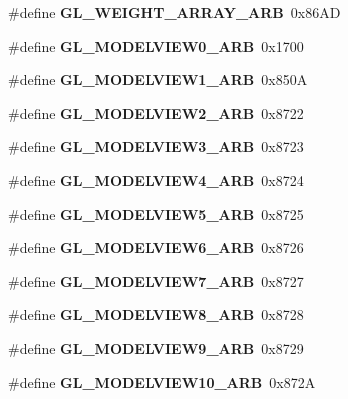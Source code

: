 \begin{DoxyCompactItemize}
\item 
\#define {\bfseries G\+L\+\_\+\+W\+E\+I\+G\+H\+T\+\_\+\+A\+R\+R\+A\+Y\+\_\+\+A\+R\+B}~0x86\+A\+D\label{_s_d_l__opengl_8h_a3689b10d11e254159d28b9b516f461f4}

\item 
\#define {\bfseries G\+L\+\_\+\+M\+O\+D\+E\+L\+V\+I\+E\+W0\+\_\+\+A\+R\+B}~0x1700\label{_s_d_l__opengl_8h_aeb39b3752a59fa1f51df89b024110926}

\item 
\#define {\bfseries G\+L\+\_\+\+M\+O\+D\+E\+L\+V\+I\+E\+W1\+\_\+\+A\+R\+B}~0x850\+A\label{_s_d_l__opengl_8h_a6ee7f305f7045428538999639d4f5547}

\item 
\#define {\bfseries G\+L\+\_\+\+M\+O\+D\+E\+L\+V\+I\+E\+W2\+\_\+\+A\+R\+B}~0x8722\label{_s_d_l__opengl_8h_a8dc08b37e90f3123ea27e6dbf5e01ac7}

\item 
\#define {\bfseries G\+L\+\_\+\+M\+O\+D\+E\+L\+V\+I\+E\+W3\+\_\+\+A\+R\+B}~0x8723\label{_s_d_l__opengl_8h_a8bad9653084a1f64c44609664868a527}

\item 
\#define {\bfseries G\+L\+\_\+\+M\+O\+D\+E\+L\+V\+I\+E\+W4\+\_\+\+A\+R\+B}~0x8724\label{_s_d_l__opengl_8h_a83fc3a493f188752436bbd0a0d74296c}

\item 
\#define {\bfseries G\+L\+\_\+\+M\+O\+D\+E\+L\+V\+I\+E\+W5\+\_\+\+A\+R\+B}~0x8725\label{_s_d_l__opengl_8h_ae64453e3222c8b6d37dec88492552ae4}

\item 
\#define {\bfseries G\+L\+\_\+\+M\+O\+D\+E\+L\+V\+I\+E\+W6\+\_\+\+A\+R\+B}~0x8726\label{_s_d_l__opengl_8h_a98cb5de6fb7bcde330f58a9a0cbcf701}

\item 
\#define {\bfseries G\+L\+\_\+\+M\+O\+D\+E\+L\+V\+I\+E\+W7\+\_\+\+A\+R\+B}~0x8727\label{_s_d_l__opengl_8h_a917edab383c3fa1c955d31fa995cc222}

\item 
\#define {\bfseries G\+L\+\_\+\+M\+O\+D\+E\+L\+V\+I\+E\+W8\+\_\+\+A\+R\+B}~0x8728\label{_s_d_l__opengl_8h_ac19ed02429a8b229877da4d1db521e2a}

\item 
\#define {\bfseries G\+L\+\_\+\+M\+O\+D\+E\+L\+V\+I\+E\+W9\+\_\+\+A\+R\+B}~0x8729\label{_s_d_l__opengl_8h_a0d43d460af5a70905259b64d6a4161c2}

\item 
\#define {\bfseries G\+L\+\_\+\+M\+O\+D\+E\+L\+V\+I\+E\+W10\+\_\+\+A\+R\+B}~0x872\+A\label{_s_d_l__opengl_8h_a72301c30dfc55bbf2e09efb1afd5b981}


\end{DoxyCompactItemize}
